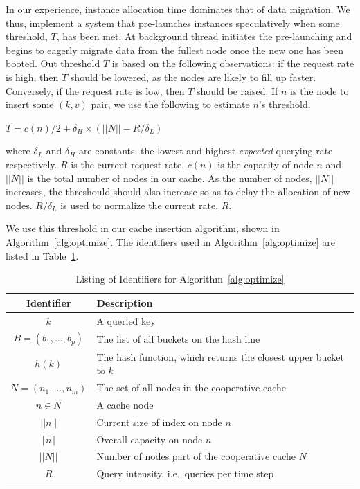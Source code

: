 In our experience, instance allocation time dominates that of data migration.
We thus, implement a system that pre-launches instances speculatively when some
threshold, $T$, has been met. At background thread initiates the pre-launching
and begins to eagerly migrate data from the fullest node once the new one has
been booted. Out threshold $T$ is based on the following observations: if the
request rate is high, then $T$ should be lowered, as the nodes are likely to
fill up faster. Conversely, if the request rate is low, then $T$ should be
raised. If $n$ is the node to insert some $(k,v)$ pair, we use the following to
estimate $n$'s threshold.
\begin{center}
  $T = c(n)/2 + \delta_H \times (||N|| - R/\delta_L)$
\end{center}
where $\delta_L$ and $\delta_H$ are constants: the lowest and highest
\emph{expected} querying rate respectively. $R$ is the current request rate,
$c(n)$ is the capacity of node $n$ and $||N||$ is the total number of nodes in
our cache. As the number of nodes, $||N||$ increases, the threshould should
also increase so as to delay the allocation of new nodes. $R/\delta_L$ is used
to normalize the current rate, $R$.

We use this threshold in our cache insertion algorithm, shown in
Algorithm~\ref{alg:optimize}. The identifiers used in
Algorithm~\ref{alg:optimize} are listed in Table~\ref{tab:vars1}.

\begin{table}[htp]
\caption{\label{tab:vars1}Listing of Identifiers for Algorithm~\ref{alg:optimize}}
\centering
\begin{tabular}[]{| c || p{5.5cm} |}
  \hline
  \textbf{Identifier} & \textbf{Description} \\
  \hline
  \hline

  $k$ & A queried key \\
  \hline
  $B = (b_1, \ldots, b_p)$ & The list of all buckets on the hash line\\
  \hline
  $h(k)$ & The hash function, which returns the closest upper bucket to $k$ \\
  \hline
  $N =(n_1, \ldots, n_m)$  & The set of all nodes in the cooperative cache \\
  \hline
  $n \in N$  & A cache node  \\
  \hline
  $||n||$  & Current size of index on node $n$  \\
  \hline
  $\lceil{n}\rceil$  & Overall capacity on node $n$ \\
  \hline
 $||N||$  & Number of nodes part of the cooperative cache $N$  \\
  \hline
  $R$  & Query intensity, i.e.\ queries per time step  \\
\hline
  \end{tabular}
\end{table}

